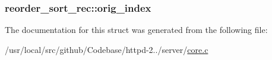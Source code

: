 \subsubsection[{\texorpdfstring{orig\+\_\+index}{orig_index}}]{ reorder\+\_\+sort\+\_\+rec\+::orig\+\_\+index}\hypertarget{structreorder__sort__rec_a374f0efc9b321a5d6cb2db016e55aca9}{}\label{structreorder__sort__rec_a374f0efc9b321a5d6cb2db016e55aca9}


The documentation for this struct was generated from the following file\+:\begin{DoxyCompactItemize}
\item 
/usr/local/src/github/\+Codebase/httpd-\/2../server/\hyperlink{core_8c}{core.\+c}\end{DoxyCompactItemize}
